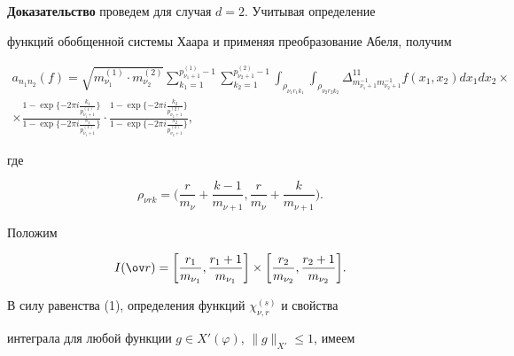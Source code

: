 {\bf Доказательство} проведем для случая $d=2$. Учитывая определение 


функций обобщенной системы Хаара и применяя преобразование Абеля, получим


\begin{multline}


a_{n_{1}n_{2}}(f)=\sqrt{m_{\nu_{1}}^{(1)}\cdot m_{\nu_{2}}^{(2)}}


\sum_{k_{1}=1}^{p_{\nu_{1}+1}^{(1)}-1}\sum_{k_{2}=1}^{p_{\nu_{2}+1} 


^{(2)}-1}\int_{\rho_{\nu_{1}r_{1}k_{1}}}\int_{\rho_{\nu_{2}r_{2}k_{2}}} 


\Delta_{m_{\nu_{1}+1}^{-1}m_{\nu_{2}+1}^{-1}}^{11}f(x_{1},x_{2})dx_{1}dx_{2}


\times \\


%


\times\frac{1-\exp\{-2\pi i\frac{k_{1}}{p_{\nu_{1}+1}^{(1)}}\}}


{1-\exp\{-2\pi i\frac{s_{1}}{p_{\nu_{1}+1}^{(1)}}\}}\cdot 


\frac{1-\exp\{-2\pi i\frac{k_{2}}{p_{\nu_{2}+1}^{(2)}}\}}


{1-\exp\{-2\pi i\frac{s_{2}}{p_{\nu_{2}+1}^{(2)}}\}},


\end{multline}


где


$$


\rho_{\nu rk}=\bigg(\frac{r}{m_{\nu}}+\frac{k-1}{m_{\nu+1}},


\frac{r}{m_{\nu}}+\frac{k}{m_{\nu+1}}\bigg).


$$





Положим


$$


I(\ov r)=\bigg[\frac{r_{1}}{m_{\nu_{1}}},\frac{r_{1}+1}{m_{\nu_{1}}} \bigg]


\times\bigg[\frac{r_{2}}{m_{\nu_{2}}},\frac{r_{2}+1}{m_{\nu_{2}}} \bigg].


$$





В силу равенства (1), определения функций $\chi_{\nu,r}^{(s)}$ и свойства 


интеграла для любой функции $g\in X'(\varphi)$, $\|g\|_{X'}\leq 1$, имеем


